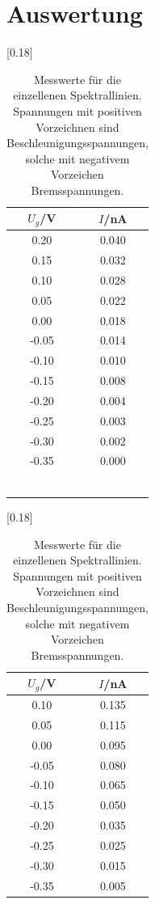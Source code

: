 \section{Auswertung}
\begin{table}
  \centering
  \caption{Messwerte für die einzellenen Spektrallinien. Spannungen mit positiven
  Vorzeichnen sind Beschleunigungsspannungen, solche mit negativem Vorzeichen
  Bremsspannungen.}
  \label{tab:1}
  [0.18\textwidth]{
    \begin{tabular}{c c}
      \toprule
      $U_g$/\si{\volt} & $I$/\si{\nano\ampere}\\
      \midrule
      0.20 & 0.040 \\
      0.15 & 0.032 \\
      0.10 & 0.028 \\
      0.05 & 0.022 \\
      0.00 & 0.018 \\
      -0.05 & 0.014 \\
      -0.10 & 0.010 \\
      -0.15 & 0.008 \\
      -0.20 & 0.004 \\
      -0.25 & 0.003 \\
      -0.30 & 0.002 \\
      -0.35 & 0.000 \\
      \\
      \\
      \\
      \\
      \\
      \\
      \bottomrule
    \end{tabular}
    }
  [0.18\textwidth]{
    \begin{tabular}{c c}
      \toprule
      $U_g$/\si{\volt} & $I$/\si{\nano\ampere}\\
      \midrule
      0.10 & 0.135 \\
      0.05 & 0.115 \\
      0.00 & 0.095 \\
      -0.05 & 0.080 \\
      -0.10 & 0.065 \\
      -0.15 & 0.050 \\
      -0.20 & 0.035 \\
      -0.25 & 0.025 \\
      -0.30 & 0.015 \\
      -0.35 & 0.005 \\

\end{tabular}}
\end{table}
